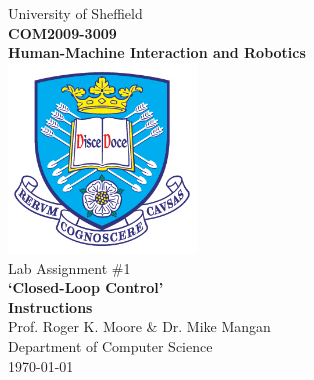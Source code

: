 \documentclass[hidelinks,a4paper,11pt]{article}
\begin{document}
\begin{titlepage}

\begin{center}
{\LARGE University of Sheffield}\\[1cm]
\huge {\bfseries COM2009-3009\\Human-Machine Interaction and Robotics}\\[1cm]
\includegraphics[width=5cm]{tuoslogo.png}\\[1cm]
{\LARGE Lab Assignment \#1\\\textbf{`Closed-Loop Control'}}\\[2cm]

{\huge \bfseries Instructions}\\[0.5cm]
{\Large Prof. Roger K. Moore \& Dr. Mike Mangan}\\[1cm]



{\LARGE Department of Computer Science}\\
{\Large \today}
\end{center}

\end{titlepage}

\tableofcontents
\newpage
\end{document}
